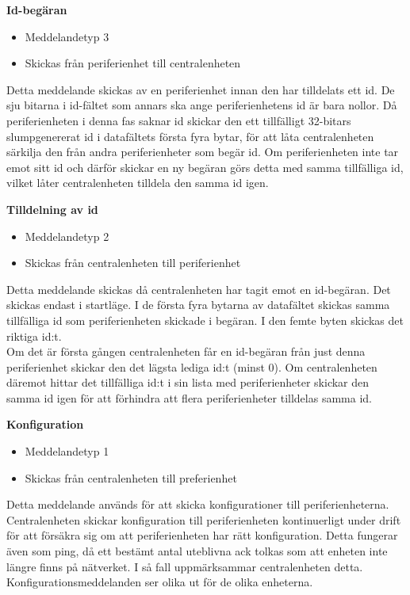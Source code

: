 \textbf{Id-begäran}
\label{idbegäran}
\begin{itemize}
	\item Meddelandetyp 3
	\item Skickas från periferienhet till centralenheten
\end{itemize}
Detta meddelande skickas av en periferienhet innan den har tilldelats ett id. 
De sju bitarna i id-fältet som annars ska ange periferienhetens id är bara nollor.
Då periferienheten i denna fas saknar id skickar den ett tillfälligt 32-bitars slumpgenererat id i datafältets första fyra bytar, för att låta centralenheten särkilja den från andra periferienheter som begär id.
Om periferienheten inte tar emot sitt id och därför skickar en ny begäran görs detta med samma tillfälliga id, vilket låter centralenheten tilldela den samma id igen.

\textbf{Tilldelning av id}
\label{idtilldelning}
\begin{itemize}
	\item Meddelandetyp 2
	\item Skickas från centralenheten till periferienhet
\end{itemize}
Detta meddelande skickas då centralenheten har tagit emot en id-begäran. Det skickas endast i startläge. I de första fyra bytarna av datafältet skickas samma tillfälliga id som periferienheten skickade i begäran. I den femte byten skickas det riktiga id:t. \\
Om det är första gången centralenheten får en id-begäran från just denna periferienhet skickar den det lägsta lediga id:t (minst 0). Om centralenheten däremot hittar det tillfälliga id:t i sin lista med periferienheter skickar den samma id igen för att förhindra att flera periferienheter tilldelas samma id.


\textbf{Konfiguration}
\begin{itemize}
    \item Meddelandetyp 1
    \item Skickas från centralenheten till preferienhet
\end{itemize}	
Detta meddelande används för att skicka konfigurationer till periferienheterna.
Centralenheten skickar konfiguration till periferienheten kontinuerligt under drift för att försäkra sig om att periferienheten har rätt konfiguration. Detta fungerar även som ping, då ett bestämt antal uteblivna ack tolkas som att enheten inte längre finns på nätverket.
I så fall uppmärksammar centralenheten detta. Konfigurationsmeddelanden ser olika ut för de olika enheterna.

